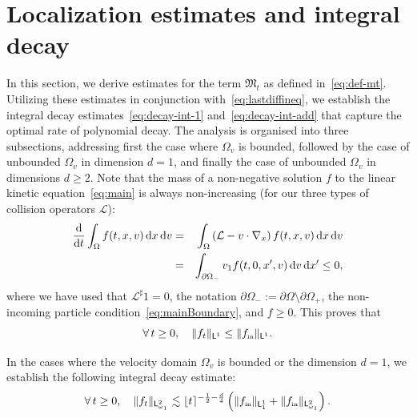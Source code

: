 \documentclass[11pt]{amsart}
\theoremstyle{definition}
\theoremstyle{remark}
\numberwithin{equation}{section}
\def\LL{{\mathcal L}}
\newcommand{\dd}{{\, \mathrm d}}
\newcommand{\dt}{\frac{{\rm d}}{{\rm d}t}}
\newcommand{\init}{\text{{\tiny {\rm in}}}}
\newcommand{\sfL}{\mathsf{L}}
\newcommand{\wangle}[1]{\lfloor #1 \rceil}
\begin{document}
\section{Localization estimates and integral decay}
\label{sec:local}

In this section, we derive estimates for the term $\mathfrak{M}_t$ as defined in~\eqref{eq:def-mt}. Utilizing these estimates in conjunction with~\eqref{eq:lastdiffineq}, we establish the integral decay estimates~\eqref{eq:decay-int-1} and~\eqref{eq:decay-int-add} that capture the optimal rate of polynomial decay. The analysis is organised into three subsections, addressing first the case where $\Omega_v$ is bounded, followed by the case of unbounded $\Omega_v$ in dimension $d=1$, and finally the case of unbounded $\Omega_v$ in dimensions $d \ge 2$. Note that the mass of a  non-negative solution $f$ to the linear kinetic equation~\eqref{eq:main} is always non-increasing (for our three types of collision operators $\LL$):
\begin{eqnarray*} 
  \dt \int_\Omega f(t,x,v) \dd x \dd v
  &=&   \int_{\Omega}  \left( \mathcal{L} - v \cdot \nabla_x\right) f(t,x,v) \dd x \dd v  \\
  &=& \int_{\partial \Omega_-} v_1  f(t,0,x',v) \dd v \dd x'\le 0,
\end{eqnarray*}
where we have used that $\LL^\sharp 1 = 0$, the notation $\partial\Omega_- := \partial\Omega \setminus \partial\Omega_+$, the non-incoming particle condition~\eqref{eq:mainBoundary}, and $f \ge 0$. This proves that
\begin{equation}
  \label{eq:mass-decay}
  \forall \, t \ge 0, \quad \| f_t \|_{\sfL^{1}} \le \| f_{\init} \|_{\sfL^{1}}.
\end{equation}

In the cases where the velocity domain $\Omega_v$ is bounded or the dimension $d=1$, we establish the following integral decay estimate:
\begin{equation}
  \label{eq:decay-int-1}
  \forall\, t \geq 0, \quad \|f_t\|_{\sfL^{2}_{\omega_1}} \lesssim \wangle{t}^{-\frac{1}{2}-\frac{d}{4}} \left( \|f_{\init}\|_{\sfL^{1}_{1}} + \|f_{\init}\|_{\sfL^{2}_{\omega_1}} \right).
\end{equation}
\end{document}
